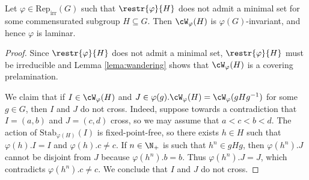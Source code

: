 \documentclass[reqno]{amsart}
\begin{document}
\begin{lema} \label{lema:noMinimal}
Let $\varphi \in \mathrm{Rep}_{\mathrm{irr}}(G)$ such that $\restr{\varphi}{H}$ does not admit a minimal set for some commensurated subgroup $H \subseteq G$. Then $\cW_\varphi(H)$ is $\varphi(G)$-invariant, and hence $\varphi$ is laminar. %
\end{lema}
\begin{proof}
Since $\restr{\varphi}{H}$ does not admit a minimal set, $\restr{\varphi}{H}$ must be irreducible and Lemma \ref{lema:wandering} shows that $\cW_\varphi(H)$ is a covering prelamination. %


We claim that if $I \in \cW_\varphi(H)$ and $J \in \varphi(g).\cW_\varphi(H) = \cW_\varphi(gHg^{-1})$ for some $g \in G$, then $I$ and $J$ do not cross. Indeed, suppose towards a contradiction that $I = (a,b)$ and $J = (c,d)$ cross, so we may assume that $a < c < b < d$. The action of $\mathrm{Stab}_{\varphi(H)}(I)$ is fixed-point-free, so there exists $h \in H$ such that $\varphi(h).I = I$ and $\varphi(h).c \neq c$. If $n \in \N_+$ is such that $h^n \in g H g$, then $\varphi(h^n).J$ cannot be disjoint from $J$ because $\varphi(h^n).b = b$. Thus $\varphi(h^n).J = J$, which contradicts $\varphi(h^n).c \neq c$.  We conclude that $I$ and $J$ do not cross.


\end{proof}
\end{document}
